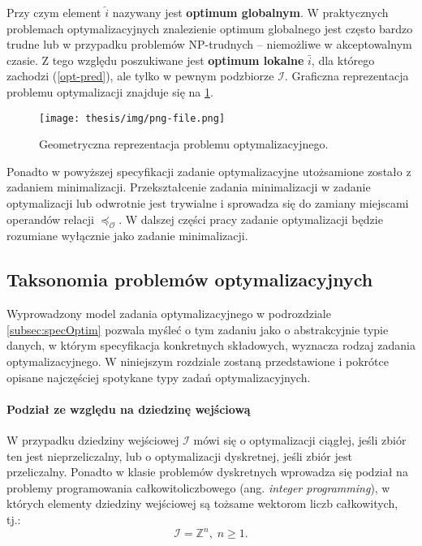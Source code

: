 Przy czym element $\hat{i}$ nazywany jest \textbf{optimum globalnym}. W praktycznych problemach optymalizacyjnych znalezienie optimum globalnego jest często bardzo trudne lub w przypadku problemów NP-trudnych -- niemożliwe w akceptowalnym czasie. Z tego względu poszukiwane jest \textbf{optimum lokalne} $\bar{i}$, dla którego zachodzi (\ref{opt-pred}), ale tylko w pewnym podzbiorze $\mathcal{I}$. Graficzna reprezentacja problemu optymalizacji znajduje się na \ref{fig:optim-spec}.
\begin{figure}
    \centering
    \texttt{[image: thesis/img/png-file.png]}
    \caption{Geometryczna reprezentacja problemu optymalizacyjnego.}
    \label{fig:optim-spec}
\end{figure}
Ponadto w powyższej specyfikacji zadanie optymalizacyjne utożsamione zostało z zadaniem minimalizacji. Przekształcenie zadania minimalizacji w zadanie optymalizacji lub odwrotnie jest trywialne i sprowadza się do zamiany miejscami operandów relacji $\preceq_{\mathcal{O}}$. W dalszej części pracy zadanie optymalizacji będzie rozumiane wyłącznie jako zadanie minimalizacji.


\subsection{Taksonomia problemów optymalizacyjnych \label{subsec:takson}}

Wyprowadzony model zadania optymalizacyjnego w podrozdziale \ref{subsec:specOptim} pozwala 
myśleć o tym zadaniu jako o abstrakcyjnie typie danych, w którym specyfikacja konkretnych składowych, wyznacza rodzaj zadania optymalizacyjnego. W niniejszym rozdziale zostaną przedstawione i pokrótce opisane najczęściej spotykane typy zadań optymalizacyjnych. \\

\paragraph{Podział ze względu na dziedzinę wejściową}

W przypadku dziedziny wejściowej $\mathcal{I}$ mówi się o optymalizacji ciągłej, jeśli zbiór ten jest nieprzeliczalny, lub o optymalizacji dyskretnej, jeśli zbiór jest przeliczalny. Ponadto w klasie problemów dyskretnych wprowadza się podział na problemy programowania całkowitoliczbowego (ang. \textit{integer programming}), w których elementy dziedziny wejściowej są tożsame wektorom liczb całkowitych, tj.:
\begin{equation*}
    \mathcal{I} = \mathbb{Z}^{n},\; n \geq 1.
\end{equation*}

